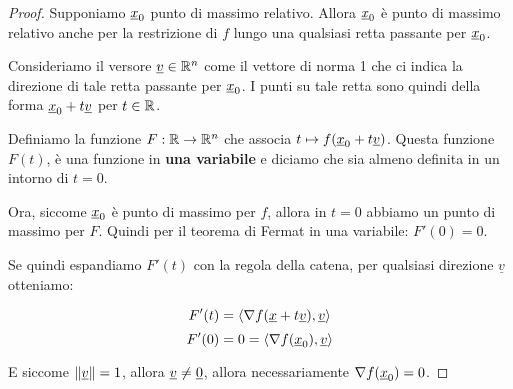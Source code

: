\filbreak{}
\begin{proof}
    Supponiamo \(\underline{x}_0\) punto di massimo relativo. Allora \(\underline{x}_0\) è punto di massimo relativo anche per la restrizione di \(f\) lungo una qualsiasi retta passante per \(\underline{x}_0\).

    Consideriamo il versore \(\underline{v} \in \mathbb{R}^{n} \) come il vettore di norma 1 che ci indica la direzione di tale retta passante per \(\underline{x}_0\). I punti su tale retta sono quindi della forma \(\underline{x}_0 + t\underline{v}\) per \(t \in \mathbb{R} \).

    Definiamo la funzione \(F: \mathbb{R} \to \mathbb{R}^{n} \) che associa \(t \mapsto f(\underline{x}_0 + t\underline{v})\). Questa funzione \(F(t)\), è una funzione in \textbf{una variabile} e diciamo che sia almeno definita in un intorno di \(t=0\).

    Ora, siccome \(\underline{x}_0\) è punto di massimo per \(f\), allora in \(t=0\) abbiamo un punto di massimo per \(F\). Quindi per il teorema di Fermat in una variabile: \(F'(0) = 0\).

    Se quindi espandiamo \(F'(t)\) con la regola della catena, per qualsiasi direzione \(\underline{v}\) otteniamo:

    \[
        F'(t) = \langle\nabla f(\underline{x} + t\underline{v}),\underline{v}\rangle
    \]
    \[
        F'(0) = 0 = \langle\nabla f(\underline{x}_0),\underline{v}\rangle
    \]

    E siccome \(\left\lVert\underline{v}\right\rVert = 1\), allora \(\underline{v} \neq \underline{0} \), allora necessariamente \(\nabla f(\underline{x}_0) = 0\).

\end{proof}

\filbreak{}


